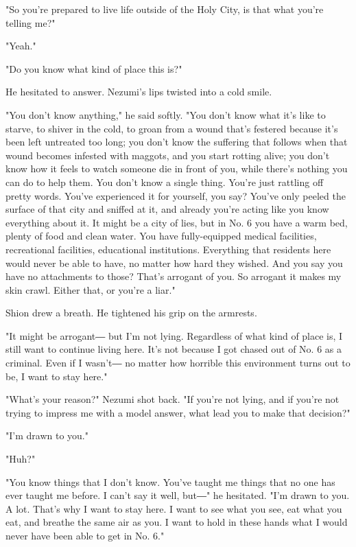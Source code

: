 "So you're prepared to live life outside of the Holy City, is that what
you're telling me?"

"Yeah."

"Do you know what kind of place this is?"

He hesitated to answer. Nezumi's lips twisted into a cold smile.

"You don't know anything," he said softly. "You don't know what it's
like to starve, to shiver in the cold, to groan from a wound that's
festered because it's been left untreated too long; you don't know the
suffering that follows when that wound becomes infested with maggots,
and you start rotting alive; you don't know how it feels to watch
someone die in front of you, while there's nothing you can do to help
them. You don't know a single thing. You're just rattling off pretty
words. You've experienced it for yourself, you say? You've only peeled
the surface of that city and sniffed at it, and already you're acting
like you know everything about it. It might be a city of lies, but in
No. 6 you have a warm bed, plenty of food and clean water. You have
fully-equipped medical facilities, recreational facilities, educational
institutions. Everything that residents here would never be able to
have, no matter how hard they wished. And you say you have no
attachments to those? That's arrogant of you. So arrogant it makes my
skin crawl. Either that, or you're a liar."

Shion drew a breath. He tightened his grip on the armrests.

"It might be arrogant― but I'm not lying. Regardless of what kind of
place is, I still want to continue living here. It's not because I got
chased out of No. 6 as a criminal. Even if I wasn't― no matter how
horrible this environment turns out to be, I want to stay here."

"What's your reason?" Nezumi shot back. "If you're not lying, and if
you're not trying to impress me with a model answer, what lead you to
make that decision?"

"I'm drawn to you."

"Huh?"

"You know things that I don't know. You've taught me things that no one
has ever taught me before. I can't say it well, but―" he hesitated. "I'm
drawn to you. A lot. That's why I want to stay here. I want to see what
you see, eat what you eat, and breathe the same air as you. I want to
hold in these hands what I would never have been able to get in No. 6."

